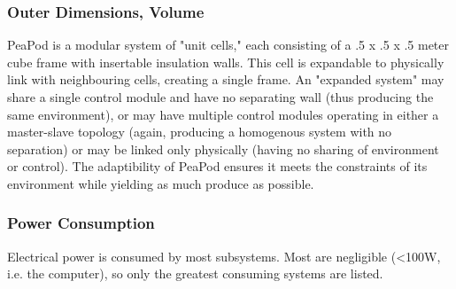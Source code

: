\documentclass{report}
\begin{document}

\subsubsection{Outer Dimensions, Volume} 
\label{sec:constraints-volume}




PeaPod is a modular system of "unit cells," each consisting of a .5 x .5 x .5 meter cube frame with insertable insulation walls. This cell is expandable to physically link with neighbouring cells, creating a single frame. An "expanded system" may share a single control module and have no separating wall (thus producing the same environment), or may have multiple control modules operating in either a master-slave topology (again, producing a homogenous system with no separation) or may be linked only physically (having no sharing of environment or control). The adaptibility of PeaPod ensures it meets the constraints of its environment while yielding as much produce as possible.


\subsubsection{Power Consumption} 
\label{sec:constraints-power}



Electrical power is consumed by most subsystems. Most are negligible (<100W, i.e. the computer), so only the greatest consuming systems are listed.
\end{document}
